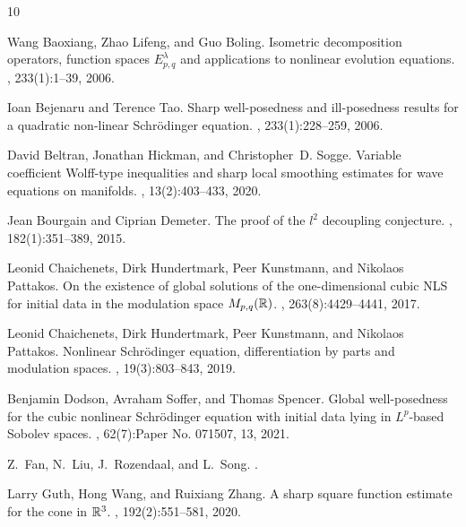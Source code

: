 \documentclass{amsart}
\theoremstyle{definition}
\numberwithin{equation}{section}
\begin{document}
\begin{thebibliography}{10}

Wang Baoxiang, Zhao Lifeng, and Guo Boling.
\newblock Isometric decomposition operators, function spaces
  {$E^\lambda_{p,q}$} and applications to nonlinear evolution equations.
, 233(1):1--39, 2006.

Ioan Bejenaru and Terence Tao.
\newblock Sharp well-posedness and ill-posedness results for a quadratic
  non-linear {S}chr\"{o}dinger equation.
, 233(1):228--259, 2006.

David Beltran, Jonathan Hickman, and Christopher~D. Sogge.
\newblock Variable coefficient {W}olff-type inequalities and sharp local
  smoothing estimates for wave equations on manifolds.
, 13(2):403--433, 2020.

Jean Bourgain and Ciprian Demeter.
\newblock The proof of the {$l^2$} decoupling conjecture.
, 182(1):351--389, 2015.

Leonid Chaichenets, Dirk Hundertmark, Peer Kunstmann, and Nikolaos Pattakos.
\newblock On the existence of global solutions of the one-dimensional cubic
  {NLS} for initial data in the modulation space {$M_{p,q}(\Bbb R)$}.
, 263(8):4429--4441, 2017.

Leonid Chaichenets, Dirk Hundertmark, Peer Kunstmann, and Nikolaos Pattakos.
\newblock Nonlinear {S}chr\"{o}dinger equation, differentiation by parts and
  modulation spaces.
, 19(3):803--843, 2019.

Benjamin Dodson, Avraham Soffer, and Thomas Spencer.
\newblock Global well-posedness for the cubic nonlinear {S}chr\"{o}dinger
  equation with initial data lying in {$L^p$}-based {S}obolev spaces.
, 62(7):Paper No. 071507, 13, 2021.

Z.~Fan, N.~Liu, J.~Rozendaal, and L.~Song.
.


Larry Guth, Hong Wang, and Ruixiang Zhang.
\newblock A sharp square function estimate for the cone in {$\Bbb {R}^3$}.
, 192(2):551--581, 2020.


\end{thebibliography}
\end{document}
